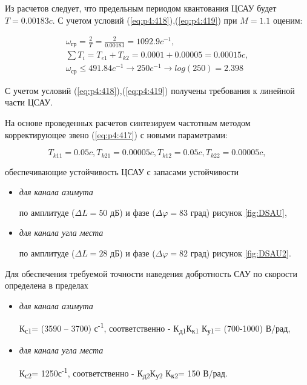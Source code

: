 Из расчетов следует, что предельным периодом квантования ЦСАУ будет $T = 0.00183 c$. С учетом условий (\ref{eq:p4:418}),(\ref{eq:p4:419}) при $M=1.1$ оценим:\par

\begin{equation}
\label{eq:p4:x}
\begin{multlined}
\omega_{\textit{гр}}=\frac{2}{T}=\frac{2}{0.00183}=1092.9 c^{-1},\\ 
\sum T_{i}=T_{\textit{e1}}+T_{k2}=0.0001+0.00005=0.00015 c, \\
\omega _{\textit{ср}} \leq 491.84 c^{-1} \rightarrow 250 c^{-1} \rightarrow log(250) = 2.398
\end{multlined}
\end{equation}

С учетом условий (\ref{eq:p4:418}),(\ref{eq:p4:419}) получены требования к линейной части ЦСАУ.\par

На основе проведенных расчетов синтезируем частотным методом \cite{Bessekerski} корректирующее звено (\ref{eq:p4:417}) с новыми параметрами: \par

\begin{equation}
\label{eq:p4:xx}
T_{k11} = 0.05 c, T_{k21} = 0.00005 c, T_{k12} = 0.05 c, T_{k22} = 0.00005 c, 
\end{equation}\par

обеспечивающие  устойчивость ЦСАУ с запасами устойчивости
\begin{itemize}
	\item \textit{для канала азимута}
	
	по амплитуде ($\varDelta L = 50$ дБ) и фазе  ($\varDelta \varphi = 83$ град) рисунок \ref{fig:DSAU},
	\item \textit{для канала угла места}
	
	по амплитуде ($\varDelta L = 28$ дБ) и фазе ($\varDelta \varphi = 82$ град)  рисунок \ref{fig:DSAU2}.
\end{itemize}

Для обеспечения требуемой точности наведения добротность САУ по скорости определена в пределах 
\begin{itemize}
	\item \textit{для канала азимута}
	
	К\textsubscript{с1}= (3590 – 3700) с\textsuperscript{-1}, соответственно - К\textsubscript{д1}К\textsubscript{к1 }К\textsubscript{у1}= (700-1000) В/рад,
	\item \textit{для канала угла места}
	
	К\textsubscript{с2}= 1250с\textsuperscript{-1}, соответственно - К\textsubscript{д2}К\textsubscript{у2} К\textsubscript{к2}= 150 В/рад.
\end{itemize}

